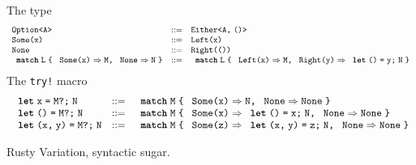 \begin{figure*}
  \begin{mdframed}\begin{highlight}
    {The  type}
    \[
      \begin{array}{lcl}
        \rvTyOpt{A} &::=& \rvTySum{A}{\rvTyUnit}
        \\
        \rvSome{x} &::=& \rvInl{x}
        \\
        \rvNone &::=& \rvInr{\rvUnit}
        \\
        \rvCaseOpt{L}{x}{M}{N} &::=& \rvCaseSum{L}{x}{M}{y}{\rvLetUnit{y}{N}}
      \end{array}
    \]
    {The \texttt{try!} macro}
    \[
      \begin{array}{lcl}
        \rvDo{x}{M}{N} &::=& \rvDoDef{x}{M}{N}
        \\
        \rvDo{\rvUnit}{M}{N} &::=& \rvDoDef{x}{M}{\rvLetUnit{x}{N}}
        \\
        \rvDo{\rvPair{x}{y}}{M}{N} &::=& \rvDoDef{z}{M}{\rvLetPair{x}{y}{z}{N}}
      \end{array}
    \]
  \end{highlight}\end{mdframed}
  \caption{Rusty Variation, syntactic sugar.}
  \label{fig:rv-syntactic-sugar}
\end{figure*}

